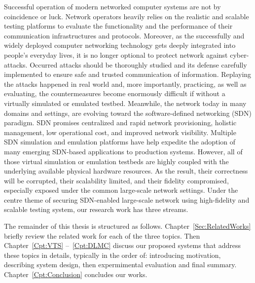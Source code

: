 Successful operation of modern networked computer systems are not by coincidence or luck.
Network operators heavily relies on the realistic and scalable testing platforms to
evaluate the functionality and the performance of their communication infrastructures and protocols.
Moreover, as the successfully and widely deployed computer networking technology gets deeply integrated into people's everyday lives,
it is no longer optional to protect network against cyber-attacks.
Occurred attacks should be thoroughly studied and its defense carefully implemented to ensure safe and trusted communication of information.
Replaying the attacks happened in real world and, more importantly, practicing, as well as evaluating, the countermeasures become 
enormously difficult if without a virtually simulated or emulated testbed.
Meanwhile, the network today in many domains and settings, are evolving toward the software-defined networking (SDN) paradigm.
SDN promises centralized and rapid network provisioning, holistic management, low operational cost, and improved network visibility.
Multiple SDN simulation and emulation platforms have help expedite the adoption of many emerging SDN-based applications to production systems.
However, all of those virtual simulation or emulation testbeds are highly coupled with the underlying available physical hardware resources.
As the result, their correctness will be corrupted, their scalability limited, and their fidelity compromised,
especially exposed under the common large-scale network settings.
Under the centre theme of securing SDN-enabled large-scale network using high-fidelity and scalable testing system, our research work has three streams.






The remainder of this thesis is structured as follows.
Chapter~\ref{Sec:RelatedWorks} briefly review the related work for each of the three topics.
Then Chapter~\ref{Cpt:VTS} --~\ref{Cpt:DLMC} discuss our proposed systems that address these topics in details,
typically in the order of: introducing motivation, describing system design,
then expermimental evaluation and final summary.
Chapter~\ref{Cpt:Conclusion} concludes our works.
